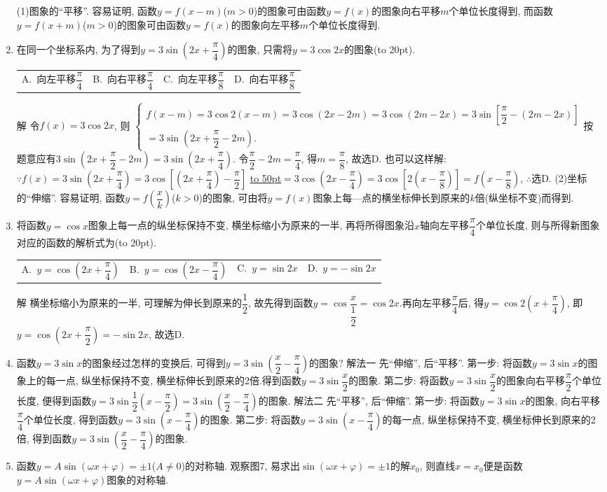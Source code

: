 \documentclass[10pt,a4paper]{article}
\newcommand{\blank}[1]{\underline{\hbox to #1pt{}}}
\newcommand{\bracket}[1]{(\hbox to #1pt{})}
\newcommand{\fourch}[4]{\par\begin{tabular}{p{.23\textwidth}p{.23\textwidth}p{.23\textwidth}p{.23\textwidth}}
A.~#1 &B.~#2& C.~#3& D.~#4
\end{tabular}}
\begin{document}
\begin{enumerate}[1.]
(1)图象的``平移''.
容易证明, 函数$y=f(x-m)$($m>0$)的图象可由函数$y=f(x)$的图象向右平移$m$个单位长度得到, 而函数$y=f(x+m)$($m>0$)的图象可由函数$y=f(x)$的图象向左平移$m$个单位长度得到.
\item 在同一个坐标系内, 为了得到$y=3\sin (2x+\dfrac{\pi }4)$的图象, 只需将$y=3\cos 2x$的图象\bracket{20}.
\fourch{向左平移$\dfrac{\pi }4$}{向右平移$\dfrac{\pi }4$}{向左平移$\dfrac{\pi }8$}{向右平移$\dfrac{\pi }8$}
解  令$f(x)=3\cos 2x$, 则
$\begin{cases} f(x-m)=3\cos 2(x-m)=3\cos (2x-2m)=3\cos (2m-2x)=3\sin [\dfrac{\pi }2-(2m-2x)] \\ =3\sin (2x+\dfrac{\pi }2-2m).
\end{cases}$按题意应有$3\sin (2x+\dfrac{\pi }2-2m)=3\sin (2x+\dfrac{\pi }4)$.
令$\dfrac{\pi }2-2m=\dfrac{\pi }4$, 得$m=\dfrac{\pi }8$, 故选D.
也可以这样解:
$\because f(x)=3\sin (2x+\dfrac{\pi }4)=3\cos [(2x+\dfrac{\pi }4)-\dfrac{\pi }2]$
\blank{50}$=3\cos (2x-\dfrac{\pi }4)=3\cos [2(x-\dfrac{\pi }8)]=f(x-\dfrac{\pi }8)$,
$\therefore$选D.
(2)坐标的``伸缩''.
容易证明, 函数$y=f(\dfrac xk)$($k>0$)的图象, 可由将$y=f(x)$图象上每—点的横坐标伸长到原来的$k$倍(纵坐标不变)而得到.
\item 将函数$y=\cos x$图象上每一点的纵坐标保持不变, 横坐标缩小为原来的一半, 再将所得图象沿$x$轴向左平移$\dfrac{\pi }4$个单位长度, 则与所得新图象对应的函数的解析式为\bracket{20}.
\fourch{$y=\cos (2x+\dfrac{\pi }4)$}{$y=\cos (2x-\dfrac{\pi }4)$}{$y=\sin 2x$}{$y=-\sin 2x$}
解  横坐标缩小为原来的一半, 可理解为伸长到原来的$\dfrac 12$, 故先得到函数$y=\cos \dfrac x{\dfrac 12}=\cos 2x$.再向左平移$\dfrac{\pi }4$后, 得$y=\cos 2(x+\dfrac{\pi }4)$, 即$y=\cos (2x+\dfrac{\pi }2)=-\sin 2x$, 故选D.
\item 函数$y=3\sin x$的图象经过怎样的变换后, 可得到$y=3\sin (\dfrac x2-\dfrac{\pi }4)$的图象?
解法一  先``伸缩'', 后``平移''.
第一步: 将函数$y=3\sin x$的图象上的每一点, 纵坐标保持不变, 横坐标伸长到原来的2倍.得到函数$y=3\sin \dfrac x2$的图象.
第二步: 将函数$y=3\sin \dfrac x2$的图象向右平移$\dfrac{\pi }2$个单位长度, 便得到函数$y=3\sin \dfrac 12(x-\dfrac{\pi }2)=3\sin (\dfrac x2-\dfrac{\pi }4)$的图象.
解法二  先``平移'', 后``伸缩''.
第一步: 将函数$y=3\sin x$的图象, 向右平移$\dfrac{\pi }4$个单位长度, 得到函数$y=3\sin (x-\dfrac{\pi }4)$的图象.
第二步: 将函数$y=3\sin (x-\dfrac{\pi }4)$的每一点, 纵坐标保持不变, 横坐标伸长到原来的2倍, 得到函数$y=3\sin (\dfrac x2-\dfrac{\pi }4)$的图象.
\item 函数$y=A\sin (\omega x+\varphi)=\pm 1$($A\ne 0$)的对称轴.
观察图7, 易求出$\sin (\omega x+\varphi)=\pm 1$的解$x_0$, 则直线$x=x_0$便是函数$y=A\sin (\omega x+\varphi)$图象的对称轴.

\end{enumerate}
\end{document}
